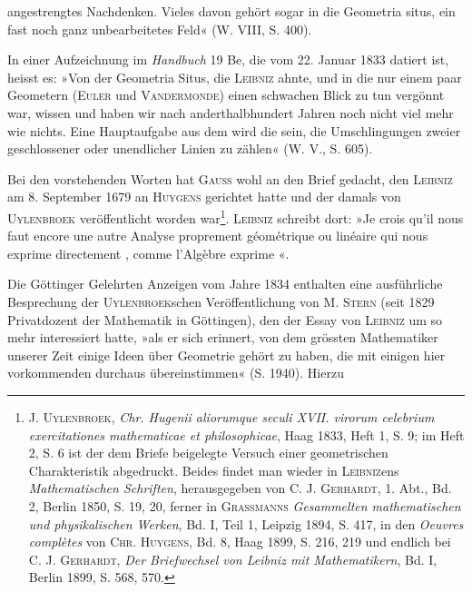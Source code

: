 angestrengtes Nachdenken. Vieles davon gehört sogar in die Geometria situs,
ein fast noch ganz unbearbeitetes Feld« (W. VIII, S. 400).
\par
In einer Aufzeichnung im \textit{Handbuch} 19 Be, die vom 22. Januar 1833
datiert ist, heisst es: »Von der Geometria Situs, die \textsc{Leibniz} ahnte, und in
die nur einem paar Geometern (\textsc{Euler} und \textsc{Vandermonde}) einen schwachen
Blick zu tun vergönnt war, wissen und haben wir nach anderthalbhundert
Jahren noch nicht viel mehr wie nichts. Eine Hauptaufgabe aus dem
\clearpage{}\setcounter{footnote}{0}
\noindent {} wird
die sein, die Umschlingungen zweier geschlossener oder unendlicher Linien
zu zählen« (W. V., S. 605).
\par
Bei den vorstehenden Worten hat \textsc{Gauss} wohl an den Brief gedacht, den
\textsc{Leibniz} am 8. September 1679 an \textsc{Huygens} gerichtet hatte und der damals
von \textsc{Uylenbroek} veröffentlicht worden war\footnote{J. \textsc{Uylenbroek}, \textit{Chr. Hugenii aliorumque seculi XVII. virorum celebrium exercitationes mathematicae et philosophicae}, Haag 1833, Heft 1, S. 9; im Heft 2, S. 6 ist der dem Briefe beigelegte Versuch einer geometrischen Charakteristik abgedruckt. Beides findet man wieder in \textsc{Leibniz}ens \textit{Mathematischen Schriften}, herausgegeben von C. J. \textsc{Gerhardt}, 1. Abt., Bd. 2, Berlin 1850, S. 19, 20, ferner in \textsc{Grassmanns} \textit{Gesammelten mathematischen und physikalischen Werken}, Bd. I, Teil 1, Leipzig 1894, S. 417, in den \textit{Oeuvres complètes} von \textsc{Chr. Huygens}, Bd. 8, Haag 1899, S. 216, 219 und endlich bei C. J. \textsc{Gerhardt}, \textit{Der Briefwechsel von Leibniz mit Mathematikern}, Bd. I, Berlin 1899, S. 568, 570.}. \textsc{Leibniz} schreibt dort: »Je crois
qu’il nous faut encore une autre Analyse proprement géométrique ou linéaire
qui nous exprime directement , comme l’Algèbre exprime «.
\par
Die Göttinger Gelehrten Anzeigen vom Jahre 1834 enthalten eine ausführliche
Besprechung der \textsc{Uylenbroek}schen Veröffentlichung von M. \textsc{Stern}
(seit 1829 Privatdozent der Mathematik in Göttingen), den der Essay von
\textsc{Leibniz} um so mehr interessiert hatte, »als er sich erinnert, von dem grössten
Mathematiker unserer Zeit einige Ideen über Geometrie gehört zu haben, die
mit einigen hier vorkommenden durchaus übereinstimmen« (S. 1940). Hierzu
